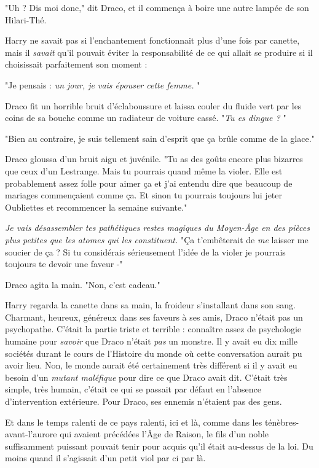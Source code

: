 "Uh ? Dis moi donc," dit Draco, et il commença à boire une autre lampée de son Hilari-Thé.

Harry ne savait pas si l'enchantement fonctionnait plus d'une fois par canette, mais il \emph{savait}  qu'il pouvait éviter la responsabilité de ce qui allait se produire si il choisissait parfaitement son moment :

"Je pensais : \emph{un jour, je vais épouser cette femme.} "

Draco fit un horrible bruit d'éclaboussure et laissa couler du fluide vert par les coins de sa bouche comme un radiateur de voiture cassé. "\emph{Tu es dingue ?} "

"Bien au contraire, je suis tellement sain d'esprit que ça brûle comme de la glace."

Draco gloussa d'un bruit aigu et juvénile. "Tu as des goûts encore plus bizarres que ceux d'un Lestrange. Mais tu pourrais quand même la violer. Elle est probablement assez folle pour aimer ça et j'ai entendu dire que beaucoup de mariages commençaient comme ça. Et sinon tu pourrais toujours lui jeter Oubliettes et recommencer la semaine suivante."

\emph{Je vais désassembler tes pathétiques restes magiques du Moyen-Âge en des pièces plus petites que les atomes qui les constituent. } "Ça t'embêterait de \emph{me}  laisser me soucier de ça ? Si tu considérais sérieusement l'idée de la violer je pourrais toujours te devoir une faveur -"

Draco agita la main. "Non, c'est cadeau."

Harry regarda la canette dans sa main, la froideur s'installant dans son sang. Charmant, heureux, généreux dans ses faveurs à ses amis, Draco n'était pas un psychopathe. C'était la partie triste et terrible : connaître assez de psychologie humaine pour \emph{savoir}  que Draco n'était \emph{pas}  un monstre. Il y avait eu dix mille sociétés durant le cours de l'Histoire du monde où cette conversation aurait pu avoir lieu. Non, le monde aurait été certainement très différent si il y avait eu besoin d'un \emph{mutant maléfique}  pour dire ce que Draco avait dit. C'était très simple, très humain, c'était ce qui se passait par défaut en l'absence d'intervention extérieure. Pour Draco, ses ennemis n'étaient pas des gens.

Et dans le temps ralenti de ce pays ralenti, ici et là, comme dans les ténèbres-avant-l'aurore qui avaient précédées l'Âge de Raison, le fils d'un noble suffisamment puissant pouvait tenir pour acquis qu'il était au-dessus de la loi. Du moins quand il s'agissait d'un petit viol par ci par là.

